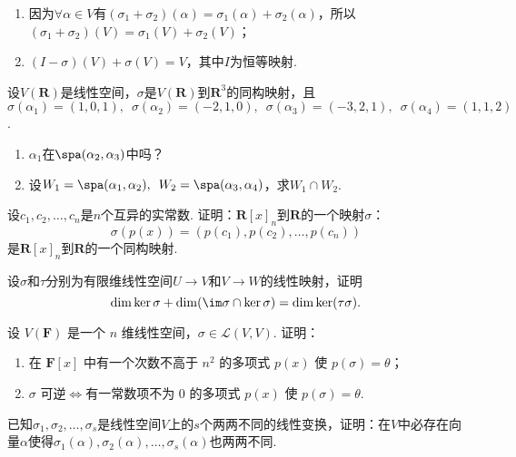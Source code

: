 \begin{exercise}
\begin{exgroup}
\begin{enumerate}
            \item 因为$\forall \alpha \in V$有$(\sigma_1+\sigma_2)(\alpha)=\sigma_1(\alpha)+\sigma_2(\alpha)$，所以$(\sigma_1+\sigma_2)(V)=\sigma_1(V)+\sigma_2(V)$；

            \item $(I-\sigma)(V)+\sigma(V)=V$，其中$I$为恒等映射.
        \end{enumerate}

        \item 设$V(\mathbf{R})$是线性空间，$\sigma$是$V(\mathbf{R})$到$\mathbf{R}^3$的同构映射，且$\sigma(\alpha_1)=(1,0,1),\enspace\allowbreak\sigma(\alpha_2)=(-2,1,0),\enspace\allowbreak\sigma(\alpha_3)=(-3,2,1),\enspace\allowbreak\sigma(\alpha_4)=(1,1,2)$.
        \begin{enumerate}
            \item $\alpha_1$在$\spa(\alpha_2,\alpha_3)$中吗？

            \item 设$W_1=\spa(\alpha_1,\alpha_2),\enspace W_2=\spa(\alpha_3,\alpha_4)$，求$W_1\cap W_2$.
        \end{enumerate}

        \item 设$c_1,c_2,\ldots,c_n$是$n$个互异的实常数. 证明：$\mathbf{R}[x]_n$到$\mathbf{R}$的一个映射$\sigma$：
        \[\sigma(p(x))=(p(c_1),p(c_2),\ldots,p(c_n))\]
        是$\mathbf{R}[x]_n$到$\mathbf{R}$的一个同构映射.

        \item 设$\sigma$和$\tau$分别为有限维线性空间$U\to V$和$V\to W$的线性映射，证明
        \[\dim\ker\sigma+\dim(\im\sigma\cap\ker\sigma)=\dim\ker(\tau\sigma).\]
    \end{exgroup}

    \begin{exgroup}
        \item 设 $V(\mathbf{F})$ 是一个 $n$ 维线性空间，$\sigma \in \mathcal{L}(V,V)$. 证明：
        \begin{enumerate}
            \item 在 $\mathbf{F}[x]$ 中有一个次数不高于 $n^2$ 的多项式 $p(x)$ 使 $p(\sigma) = \theta$；

            \item $\sigma$ 可逆$\iff$有一常数项不为 0 的多项式 $p(x)$ 使 $p(\sigma) = \theta$.
        \end{enumerate}

        \item 已知$\sigma_1,\sigma_2,\ldots,\sigma_s$是线性空间$V$上的$s$个两两不同的线性变换，证明：在$V$中必存在向量$\alpha$使得$\sigma_1(\alpha),\sigma_2(\alpha),\ldots,\sigma_s(\alpha)$也两两不同.


\end{exgroup}
\end{exercise}
